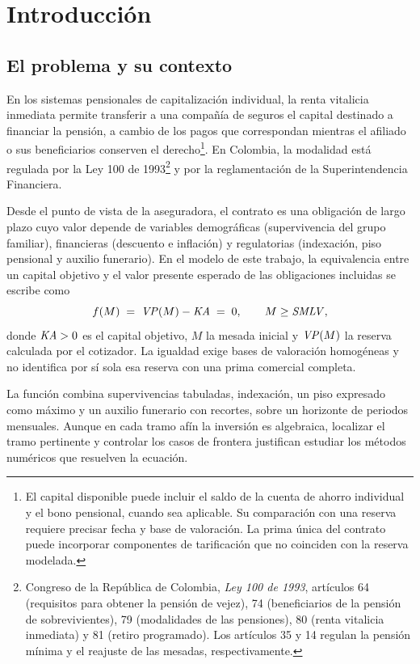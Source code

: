 \chapter{Introducción}
\label{cap:introduccion}

\section{El problema y su contexto}

En los sistemas pensionales de capitalización individual, la renta vitalicia
inmediata permite transferir a una compañía de seguros el capital destinado a
financiar la pensión, a cambio de los pagos que correspondan mientras el afiliado
o sus beneficiarios conserven el derecho\footnote{El capital disponible puede incluir el saldo de la cuenta de ahorro individual y el bono pensional, cuando sea aplicable. Su comparación con una reserva requiere precisar fecha y base de valoración. La prima única del contrato puede incorporar componentes de tarificación que no coinciden con la reserva modelada.}.
En Colombia, la modalidad está regulada por la Ley 100 de
1993\footnote{Congreso de la República de Colombia, \emph{Ley 100 de 1993}, artículos 64 (requisitos para obtener la pensión de vejez), 74 (beneficiarios de la pensión de sobrevivientes), 79 (modalidades de las pensiones), 80 (renta vitalicia inmediata) y 81 (retiro programado). Los artículos 35 y 14 regulan la pensión mínima y el reajuste de las mesadas, respectivamente.} y por la reglamentación de la Superintendencia
Financiera.

Desde el punto de vista de la aseguradora, el contrato es una obligación de largo
plazo cuyo valor depende de variables demográficas (supervivencia del grupo
familiar), financieras (descuento e inflación) y regulatorias (indexación, piso
pensional y auxilio funerario). En el modelo de este trabajo, la equivalencia entre
un capital objetivo y el valor presente esperado de las obligaciones incluidas se
escribe como
\begin{equation}
\label{eq:problema-central}
  f(M) \;=\; \mathit{VP}(M) - \mathit{KA} \;=\; 0,\qquad M\ge\mathit{SMLV},
\end{equation}
donde $\mathit{KA}>0$ es el capital objetivo, $M$ la mesada inicial y $\mathit{VP}(M)$ la reserva
calculada por el cotizador. La igualdad exige bases de valoración homogéneas y no
identifica por sí sola esa reserva con una prima comercial completa.

La función combina supervivencias tabuladas, indexación, un piso expresado como
máximo y un auxilio funerario con recortes, sobre un horizonte de
\datoNMeses{} periodos mensuales. Aunque en cada tramo afín la inversión es
algebraica, localizar el tramo pertinente y controlar los casos de frontera
justifican estudiar los métodos numéricos que resuelven la ecuación.

